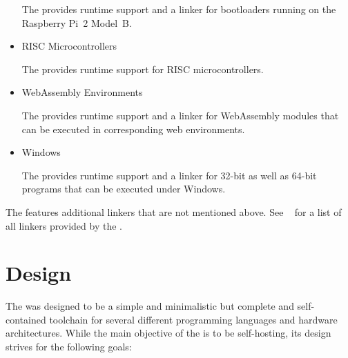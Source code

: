 \begin{itemize}
The \ecs{} provides runtime support and a linker for bootloaders running on the Raspberry Pi~2 Model~B.

\item RISC Microcontrollers\nopagebreak

The \ecs{} provides runtime support for RISC microcontrollers.

\item WebAssembly Environments\nopagebreak

The \ecs{} provides runtime support and a linker for WebAssembly modules that can be executed in corresponding web environments.

\item Windows\nopagebreak

The \ecs{} provides runtime support and a linker for 32-bit as well as 64-bit programs that can be executed under Windows.

\end{itemize}

The \ecs{} features additional linkers that are not mentioned above.
See \Documentation{}~ for a list of all linkers provided by the \ecs{}.

\section{Design}

The \ecs{} was designed to be a simple and minimalistic but complete and self-contained toolchain for several different programming languages and hardware architectures.
While the main objective of the \ecs{} is to be self-hosting, its design strives for the following goals:

